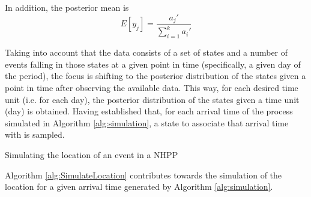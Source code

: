 \documentclass[12pt]{article}
\theoremstyle{definition}
\begin{document}
In addition, the posterior mean is 
\begin{equation*}
    E[y_j] = \frac{a_j'}{\sum_{i=1}^k a_i'}
\end{equation*}

Taking into account that the data consists of a set of states and a number of events falling in those states at a given point in time (specifically, a given day of the period), the focus is shifting to the posterior distribution of the states given a point in time after observing the available data. This way, for each desired time unit (i.e. for each day), the posterior distribution of the states given a time unit (day) is obtained. Having established that, for each arrival time of the process simulated in Algorithm \ref{alg:simulation}, a state to associate that arrival time with is sampled.

\begin{algorithm}
  \caption{Simulating the location of an event in a NHPP}
  \label{alg:SimulateLocation}
  \begin{algorithmic}
  \end{algorithmic}
\end{algorithm}

Algorithm \ref{alg:SimulateLocation} contributes towards the simulation of the location for a given arrival time generated by Algorithm \ref{alg:simulation}. 
\end{document}
